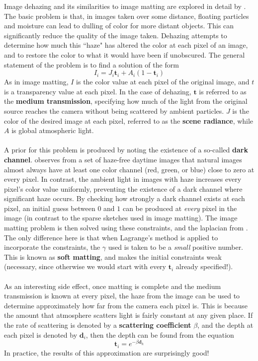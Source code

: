 Image dehazing and its similarities to image matting are explored in detail by \cite{he11}. The basic problem is that, in images taken over some distance, floating particles and moisture can lead to dulling of color for more distant objects. This can significantly reduce the quality of the image taken. Dehazing attempts to determine how much this ``haze" has altered the color at each pixel of an image, and to restore the color to what it would have been if unobscured. The general statement of the problem is to find a solution of the form
\[I_i = J_i\textbf{t}_i+A_i(1-\textbf{t}_i)\]
As in image matting, $I$ is the color value at each pixel of the original image, and $t$ is a transparency value at each pixel. In the case of dehazing, $\textbf{t}$ is referred to as the \textbf{medium transmission}, specifying how much of the light from the original source reaches the camera without being scattered by ambient particles. $J$ is the color of the desired image at each pixel, referred to as the \textbf{scene radiance}, while $A$ is global atmospheric light.
\\\\
A prior for this problem is produced by noting the existence of a so-called \textbf{dark channel}. \cite{he11} observes from a set of haze-free daytime images that natural images almost always have at least one color channel (red, green, or blue) close to zero at every pixel. In contrast, the ambient light in images with haze increases every pixel's color value uniformly, preventing the existence of a dark channel where significant haze occurs. By checking how strongly a dark channel exists at each pixel, an initial guess between $0$ and $1$ can be produced at \textit{every} pixel in the image (in contrast to the sparse sketches used in image matting). The image matting problem is then solved using these constraints, and the laplacian from \cite{levin08}. The only difference here is that when Lagrange's method is applied to incorporate the constraints, the $\gamma$ used is taken to be a \textit{small} positive number. This is known as \textbf{soft matting}, and makes the initial constraints weak (necessary, since otherwise we would start with every $\textbf{t}_i$ already specified!).
\\\\
As an interesting side effect, once matting is complete and the medium transmission is known at every pixel, the haze from the image can be used to determine approximately how far from the camera each pixel is. This is because the amount that atmosphere scatters light is fairly constant at any given place. If the rate of scattering is denoted by a \textbf{scattering coefficient} $\beta$, and the depth at each pixel is denoted by $\textbf{d}_i$, then the depth can be found from the equation
\[\textbf{t}_i=e^{-\beta \textbf{d}_k}\]
In practice, the results of this approximation are surprisingly good!